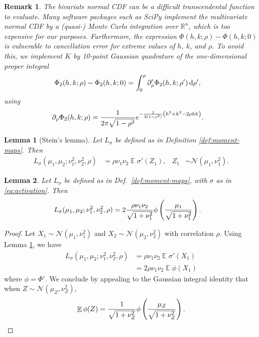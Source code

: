 \documentclass[oneside, article]{memoir}
\newtheorem{remark}{Remark}
\newtheorem{lemma}{Lemma}
\DeclareMathOperator{\expect}{\mathbb{E}}
\begin{document}
\begin{remark}
  The bivariate normal CDF can be a difficult transcendental function
  to evaluate.
  Many software packages such as SciPy \cite{wagner_kalman_2022}
  implement the multivariate normal CDF by a (quasi-) Monte Carlo
  integration over \(\mathbb{R}^n\), which is too expensive for our purposes.
  Furthermore, the expression \(\Phi(h, k; \rho) - \Phi(h, k; 0)\) is
  vulnerable to cancellation error for extreme values of \(h\),
  \(k\), and \(\rho\).
  To avoid this, we implement \(K\) by 10-point Gaussian quadrature
  of the one-dimensional proper integral \cite{drezner_computation_1990}
  \begin{align*}
    \Phi_2(h, k; \rho) -
    \Phi_2(h, k; 0)
    &= \int_0^\rho \partial_\rho' \Phi_2(h, k; \rho') \dif\rho',
  \end{align*}
  using
  \begin{align*}
    \partial_\rho \Phi_2(h, k; \rho)
    &= \frac{1}{2\pi \sqrt{1 - \rho^2}} e^{-\frac{1}{2(1 - \rho^2)}
    \del{h^2 + k^2 - 2 \rho h k}}.
  \end{align*}
\end{remark}

\begin{lemma}[Stein's lemma]
  \label{lem:stein}
  Let \(L_\sigma\) be defined as in Definition \ref{def:moment-maps}.
  Then
  \begin{align*}
    L_\sigma(\mu_1, \mu_2; \nu_1^2, \nu_2^2, \rho) &= \rho
    \nu_1 \nu_2 \expect \sigma'(Z_1),
    & Z_1 &\sim \mathcal N(\mu_1, \nu^2_1).
  \end{align*}
\end{lemma}

\begin{lemma}
  Let \(L_\sigma\) be defined as in Def.~\ref{def:moment-maps}, with
  \(\sigma\) as in \eqref{eq:activation}.
  Then
  \begin{align*}
    L_\sigma(\mu_1, \mu_2; \nu_1^2, \nu_2^2, \rho) &= 2
    \frac{\rho \nu_1 \nu_2}{\sqrt{1 + \nu_1^2}}
    \phi\del{\frac{\mu_1}{\sqrt{1 + \nu^2_1}}}.
  \end{align*}
\end{lemma}
\begin{proof}
  Let \(X_1 \sim \mathcal N(\mu_1, \nu_1^2)\) and \(X_2 \sim
  \mathcal N(\mu_2, \nu_2^2)\) with correlation \(\rho\).
  Using Lemma \ref{lem:stein}, we have
  \begin{align}
    L_\sigma(\mu_1, \mu_2; \nu_1^2, \nu_2^2, \rho)
    &= \rho \nu_1 \nu_2 \expect \sigma'(X_1)
    \\
    &= 2\rho \nu_1 \nu_2 \expect \phi(X_1)
  \end{align}
  where \(\phi = \Phi'\).
  We conclude by appealing to the Gaussian integral identity that
  when \(Z \sim \mathcal N(\mu_Z, \nu_Z^2)\),
  \begin{align}
    \expect \phi(Z) = \frac{1}{\sqrt{1 + \nu^2_Z}}
    \phi\del{\frac{\mu_Z}{\sqrt{1 + \nu^2_Z}}}.
  \end{align}
\end{proof}
\end{document}
